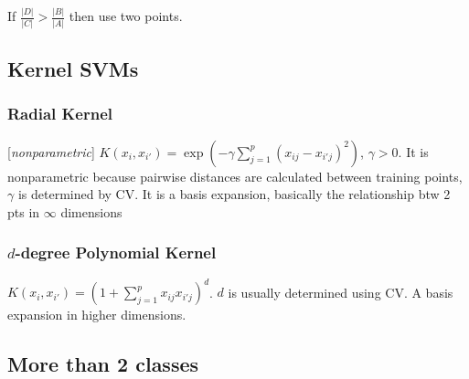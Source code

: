 \documentclass[9pt]{article}
\theoremstyle{definition}
\begin{document}
\begin{multicols}{2}

\qquad \qquad \qquad \qquad If $\frac{|D|}{|C|}>\frac{|B|}{|A|}$ then use two points.

\subsection{Kernel SVMs}
\subsubsection{Radial Kernel}
[\textit{nonparametric}] $K(x_i,x_{i'}) = \exp\left(-\gamma\sum_{j=1}^p (x_{ij}-x_{i'j})^2\right)$, $\gamma >0$.  It is nonparametric because pairwise distances are calculated between training points, $\gamma$ is determined by CV.  It is a basis expansion, basically the relationship btw 2 pts in $\infty$ dimensions
\subsubsection{$d$-degree Polynomial Kernel}
$K(x_i,x_{i'}) = (1 + \sum_{j=1}^p x_{ij}x_{i'j})^d$. $d$ is usually determined using CV.  A basis expansion in higher dimensions.
\subsection{More than 2 classes}

\end{multicols}
\end{document}

